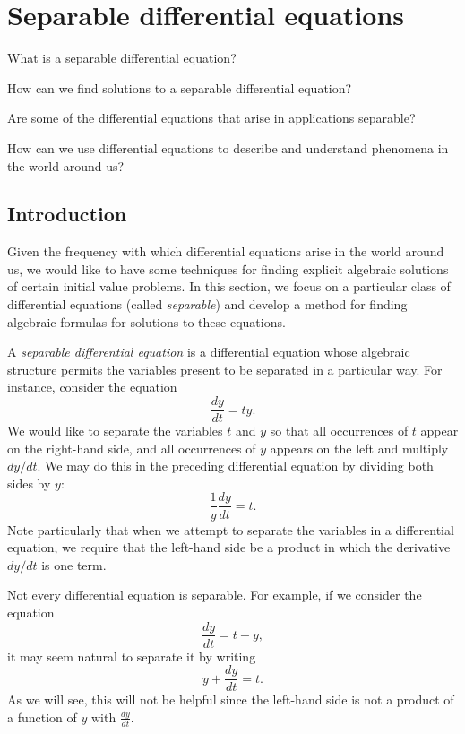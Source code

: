 \section{Separable differential equations} \label{S:6.7.SolvingDE}

\begin{goals}
\item What is a separable differential equation?  
\item How can we find solutions to a separable differential equation?
\item Are some of the differential equations that arise in applications separable?
\item How can we use differential equations to describe and understand 
  phenomena in the world around us?
\end{goals} 

\subsection*{Introduction}

Given the frequency with which differential equations arise in the world around us, we would like to have some techniques for finding explicit algebraic solutions of certain initial value problems.  In this section, we focus on a particular class of differential equations (called {\em separable}) and develop a method for finding algebraic formulas for solutions to these equations.

A {\em separable differential equation} is a differential equation whose algebraic structure permits the variables present to be separated in a particular way.  For instance, consider the equation
$$ \frac{dy}{dt} = ty. $$
We would like to separate the variables $t$ and $y$ so that all occurrences of $t$ appear on the right-hand side, and all occurrences of $y$ appears on the left and multiply $dy/dt$.  We may do this in the preceding differential equation by dividing both sides by $y$:
$$ \frac1y\frac{dy}{dt} = t. $$
Note particularly that when we attempt to separate the variables in a differential equation, we require that the left-hand side be a product in which the derivative $dy/dt$ is one term.  

Not every differential equation is separable.  For example, if we consider the equation
$$ \frac{dy}{dt} = t-y, $$
it may seem natural to separate it by writing
$$ y + \frac{dy}{dt} = t. $$
As we will see, this will not be helpful since the left-hand side is not a product of a function of $y$ with $\frac{dy}{dt}$.


